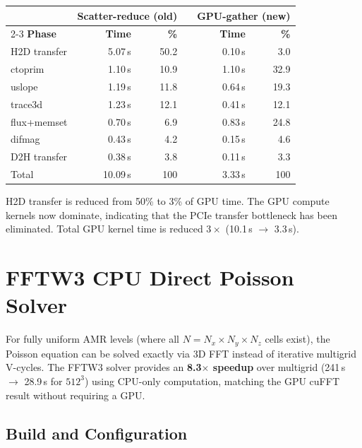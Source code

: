 \documentclass[11pt,fleqn]{book}
\begin{document}
\begin{center}
\begin{tabular}{lrrlrr}
\toprule
& \multicolumn{2}{c}{\textbf{Scatter-reduce (old)}} & & \multicolumn{2}{c}{\textbf{GPU-gather (new)}} \\
\cmidrule{2-3} \cmidrule{5-6}
\textbf{Phase} & \textbf{Time} & \textbf{\%} & & \textbf{Time} & \textbf{\%} \\
\midrule
H2D transfer   & 5.07\,s & 50.2 & & 0.10\,s &  3.0 \\
ctoprim        & 1.10\,s & 10.9 & & 1.10\,s & 32.9 \\
uslope         & 1.19\,s & 11.8 & & 0.64\,s & 19.3 \\
trace3d        & 1.23\,s & 12.1 & & 0.41\,s & 12.1 \\
flux+memset    & 0.70\,s &  6.9 & & 0.83\,s & 24.8 \\
difmag         & 0.43\,s &  4.2 & & 0.15\,s &  4.6 \\
D2H transfer   & 0.38\,s &  3.8 & & 0.11\,s &  3.3 \\
\midrule
Total          & 10.09\,s & 100  & & 3.33\,s & 100 \\
\bottomrule
\end{tabular}
\end{center}

H2D transfer is reduced from 50\% to 3\% of GPU time.  The GPU compute kernels now dominate, indicating that the PCIe transfer bottleneck has been eliminated.  Total GPU kernel time is reduced $3\times$ (10.1\,s $\to$ 3.3\,s).


\chapter{FFTW3 CPU Direct Poisson Solver}
\label{ch:fftw3}

For fully uniform AMR levels (where all $N = N_x \times N_y \times N_z$ cells exist), the Poisson equation can be solved exactly via 3D FFT instead of iterative multigrid V-cycles.  The FFTW3 solver provides an \textbf{8.3$\times$ speedup} over multigrid (241\,s $\to$ 28.9\,s for $512^3$) using CPU-only computation, matching the GPU cuFFT result without requiring a GPU.

\section{Build and Configuration}
\end{document}
